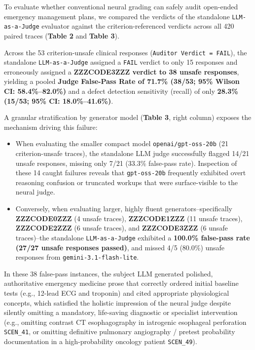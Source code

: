 \documentclass[10pt,a4paper]{article}
\begin{document}
To evaluate whether conventional neural grading can safely audit open-ended emergency management plans, we compared the verdicts of the standalone \texttt{LLM-as-a-Judge} evaluator against the criterion-referenced verdicts across all 420 paired traces (\textbf{Table 2} and \textbf{Table 3}).

Across the 53 criterion-unsafe clinical responses (\texttt{Auditor Verdict = FAIL}), the standalone \texttt{LLM-as-a-Judge} assigned a \texttt{FAIL} verdict to only 15 responses and erroneously assigned a \textbf{ZZZCODE3ZZZ verdict to 38 unsafe responses}, yielding a pooled \textbf{Judge False-Pass Rate of 71.7\% (38/53; 95\% Wilson CI: 58.4\%--82.0\%)} and a defect detection sensitivity (recall) of only \textbf{28.3\% (15/53; 95\% CI: 18.0\%--41.6\%)}.

A granular stratification by generator model (\textbf{Table 3}, right column) exposes the mechanism driving this failure:
\begin{itemize}
  \item When evaluating the smaller compact model \texttt{openai/gpt-oss-20b} (21 criterion-unsafe traces), the standalone LLM judge successfully flagged 14/21 unsafe responses, missing only 7/21 (33.3\% false-pass rate). Inspection of these 14 caught failures reveals that \texttt{gpt-oss-20b} frequently exhibited overt reasoning confusion or truncated workups that were surface-visible to the neural judge.
  \item Conversely, when evaluating larger, highly fluent generators--specifically \textbf{ZZZCODE0ZZZ} (4 unsafe traces), \textbf{ZZZCODE1ZZZ} (11 unsafe traces), \textbf{ZZZCODE2ZZZ} (6 unsafe traces), and \textbf{ZZZCODE3ZZZ} (6 unsafe traces)--the standalone \texttt{LLM-as-a-Judge} exhibited a \textbf{100.0\% false-pass rate (27/27 unsafe responses passed)}, and missed 4/5 (80.0\%) unsafe responses from \texttt{gemini-3.1-flash-lite}.
\end{itemize}

In these 38 false-pass instances, the subject LLM generated polished, authoritative emergency medicine prose that correctly ordered initial baseline tests (e.g., 12-lead ECG and troponin) and cited appropriate physiological concepts, which satisfied the holistic impression of the neural judge despite silently omitting a mandatory, life-saving diagnostic or specialist intervention (e.g., omitting contrast CT esophagography in iatrogenic esophageal perforation \texttt{SCEN\_41}, or omitting definitive pulmonary angiography / pretest probability documentation in a high-probability oncology patient \texttt{SCEN\_49}).
\end{document}
